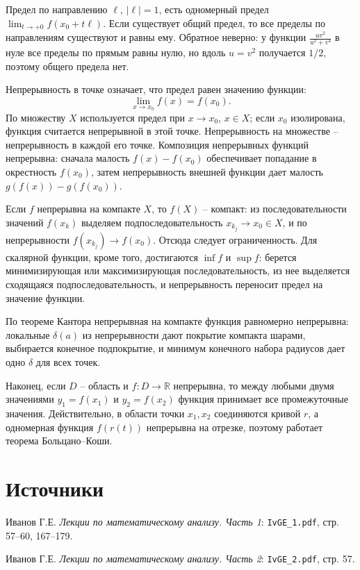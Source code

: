 \documentclass[12pt,a4paper]{article}
\newcommand{\R}{\mathbb{R}}
\begin{document}
Предел по направлению \(\ell\), \(|\ell|=1\), есть одномерный предел
\(\lim_{t\to+0}f(x_0+t\ell)\). Если существует общий предел, то все пределы по
направлениям существуют и равны ему. Обратное неверно: у функции
\(\frac{uv^2}{u^2+v^4}\) в нуле все пределы по прямым равны нулю, но вдоль
\(u=v^2\) получается \(1/2\), поэтому общего предела нет.

Непрерывность в точке означает, что предел равен значению функции:
\[
  \lim_{x\to x_0}f(x)=f(x_0).
\]
По множеству \(X\) используется предел при \(x\to x_0\), \(x\in X\); если
\(x_0\) изолирована, функция считается непрерывной в этой точке. Непрерывность
на множестве -- непрерывность в каждой его точке. Композиция непрерывных
функций непрерывна: сначала малость \(f(x)-f(x_0)\) обеспечивает попадание в
окрестность \(f(x_0)\), затем непрерывность внешней функции дает малость
\(g(f(x))-g(f(x_0))\).

Если \(f\) непрерывна на компакте \(X\), то \(f(X)\) -- компакт: из
последовательности значений \(f(x_k)\) выделяем подпоследовательность
\(x_{k_j}\to x_0\in X\), и по непрерывности \(f(x_{k_j})\to f(x_0)\). Отсюда
следует ограниченность. Для скалярной функции, кроме того, достигаются
\(\inf f\) и \(\sup f\): берется минимизирующая или максимизирующая
последовательность, из нее выделяется сходящаяся подпоследовательность, и
непрерывность переносит предел на значение функции.

По теореме Кантора непрерывная на компакте функция равномерно непрерывна:
локальные \(\delta(a)\) из непрерывности дают покрытие компакта шарами,
выбирается конечное подпокрытие, и минимум конечного набора радиусов дает одно
\(\delta\) для всех точек.

Наконец, если \(D\) -- область и \(f:D\to\R\) непрерывна, то между любыми
двумя значениями \(y_1=f(x_1)\) и \(y_2=f(x_2)\) функция принимает все
промежуточные значения. Действительно, в области точки \(x_1,x_2\) соединяются
кривой \(r\), а одномерная функция \(f(r(t))\) непрерывна на отрезке, поэтому
работает теорема Больцано--Коши.

\section*{Источники}

Иванов Г.Е. \emph{Лекции по математическому анализу. Часть 1}:
\texttt{IvGE\_1.pdf}, стр. 57--60, 167--179.

Иванов Г.Е. \emph{Лекции по математическому анализу. Часть 2}:
\texttt{IvGE\_2.pdf}, стр. 57.
\end{document}
